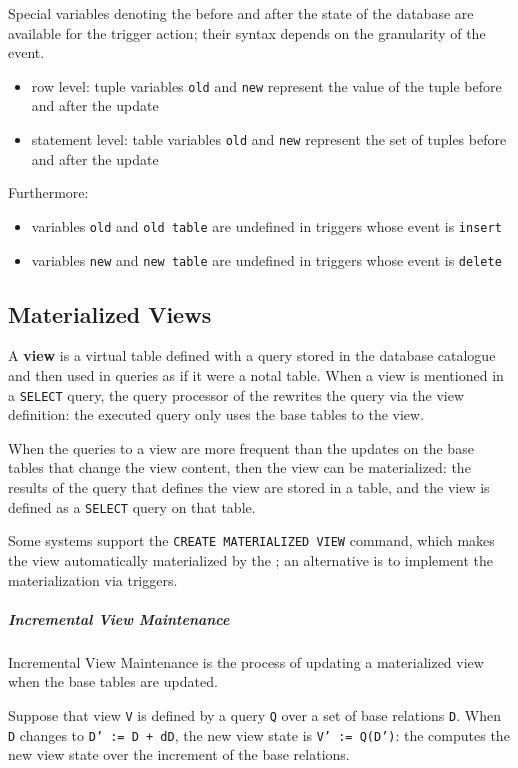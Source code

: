 \documentclass[english]{article}
\begin{document}
Special variables denoting the before and after the state of the database are available for the trigger action;
their syntax depends on the granularity of the event.

\begin{itemize}
  \item row level: tuple variables \texttt{old} and \texttt{new} represent the value of the tuple before and after the update
  \item statement level: table variables \texttt{old} and \texttt{new} represent the set of tuples before and after the update
\end{itemize}

Furthermore:

\begin{itemize}
  \item variables \texttt{old} and \texttt{old table} are undefined in triggers whose event is \texttt{insert}
  \item variables \texttt{new} and \texttt{new table} are undefined in triggers whose event is \texttt{delete}
\end{itemize}

\subsection{Materialized Views}

A \textbf{view} is a virtual table defined with a query stored in the database catalogue and then used in queries as if it were a notal table.
When a view is mentioned in a \texttt{SELECT} query, the query processor of the \dbms rewrites the query via the view definition:
the executed query only uses the base tables to the view.

When the queries to a view are more frequent than the updates on the base tables that change the view content, then the view can be materialized:
the results of the query that defines the view are stored in a table, and the view is defined as a \texttt{SELECT} query on that table.

Some systems support the \texttt{CREATE MATERIALIZED VIEW} command, which makes the view automatically materialized by the \dbms;
an alternative is to implement the materialization via triggers.

\subparagraph*{Incremental View Maintenance}
Incremental View Maintenance is the process of updating a materialized view when the base tables are updated.

Suppose that view \texttt{V} is defined by a query \texttt{Q} over a set of base relations \texttt{D}.
When \texttt{D} changes to \texttt{D' := D + dD}, the new view state is \texttt{V' := Q(D')}:
the \dbms computes the new view state over the increment of the base relations.
\end{document}
